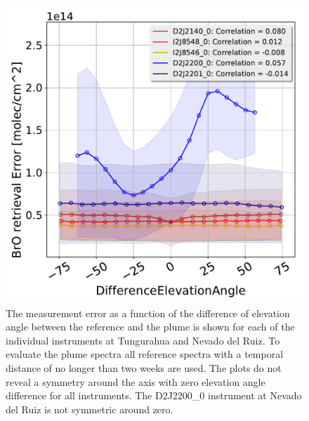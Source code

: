 \begin{figure}[h!]
    \centering
    \includegraphics[width=0.7\linewidth]{Bilder/DiffElevAngleallInstruments}
    \caption[The  measurement error as a function of the difference of elevation angle. Data of Tungurahua and Nevado del Ruiz]{The  measurement error as a function of the difference of elevation angle between the reference and the plume is shown for each of the individual instruments at Tungurahua and Nevado del Ruiz. To evaluate the plume spectra all reference spectra with a temporal distance of no longer than two weeks are used. The plots do not reveal a symmetry around the axis with zero elevation angle difference for all instruments. The D2J2200\_0 instrument at Nevado del Ruiz is not symmetric around zero.}
    \label{fig:diffeleangle}
\end{figure}
